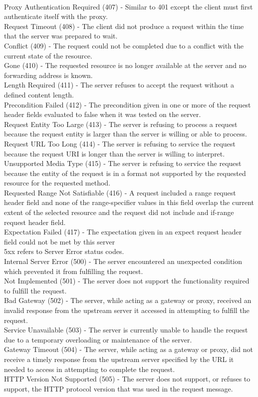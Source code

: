\documentclass[titlepage]{article}
\begin{document}
\\
Proxy Authentication Required (407) - Similar to 401 except the client must first authenticate itself with the proxy.
\\
Request Timeout (408) - The client did not produce a request within the time that the server was prepared to wait.
\\
Conflict (409) - The request could not be completed due to a conflict with the current state of the resource.
\\
Gone (410) - The requested resource is no longer available at the server and no forwarding address is known.
\\
Length Required (411) - The server refuses to accept the request without a defined content length.
\\
Precondition Failed (412) - The precondition given in one or more of the request header fields evaluated to false when it was tested on the server. 
\\
Request Entity Too Large (413) - The server is refusing to process a request because the request entity is larger than the server is willing or able to process.
\\
Request URL Too Long (414) - The server is refusing to service the request because the request URI is longer than the server is willing to interpret.
\\
Unsupported Media Type (415) - The server is refusing to service the request because the entity of the request is in a format not supported by the requested resource for the requested method.
\\
Requested Range Not Satisfiable (416) - A request included a range request header field and none of the range-specifier values in this field overlap the current extent of the selected resource and the request did not include and if-range request header field.
\\
Expectation Failed (417) - The expectation given in an expect request header field could not be met by this server
\\
5xx refers to Server Error status codes.
\\
Internal Server Error (500) - The server encountered an unexpected condition which prevented it from fulfilling the request.
\\
Not Implemented (501) - The server does not support the functionality required to fulfill the request.
\\
Bad Gateway (502) - The server, while acting as a gateway or proxy, received an invalid response from the upstream server it accessed in attempting to fulfill the request.
\\
Service Unavailable (503) - The server is currently unable to handle the request due to a temporary overloading or maintenance of the server.
\\
Gateway Timeout (504) - The server, while acting as a gateway or proxy, did not receive a timely response from the upstream server specified by the URL it needed to access in attempting to complete the request.
\\
HTTP Version Not Supported (505) - The server does not support, or refuses to support, the HTTP protocol version that was used in the request message.
\\
\end{document}
